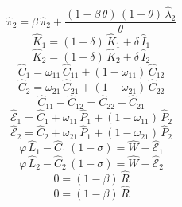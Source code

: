 \begin{dmath}
{{\hat{\pi}_{2}}}={{\beta}}\, {{\hat{\pi}_{2}}}+\frac{\left(1-{{\beta}}\, {{\theta}}\right)\, \left(1-{{\theta}}\right)\, {{\hat{\lambda}_{2}}}}{{{\theta}}}
\end{dmath}
\begin{dmath}
{{\hat{K}_{1}}}=\left(1-{{\delta}}\right)\, {{\hat{K}_{1}}}+{{\delta}}\, {{\hat{I}_{1}}}
\end{dmath}
\begin{dmath}
{{\hat{K}_{2}}}=\left(1-{{\delta}}\right)\, {{\hat{K}_{2}}}+{{\delta}}\, {{\hat{I}_{2}}}
\end{dmath}
\begin{dmath}
{{\hat{C}_{1}}}={{\omega_{11}}}\, {{\hat{C}_{1 1}}}+\left(1-{{\omega_{11}}}\right)\, {{\hat{C}_{1 2}}}
\end{dmath}
\begin{dmath}
{{\hat{C}_{2}}}={{\omega_{21}}}\, {{\hat{C}_{2 1}}}+\left(1-{{\omega_{21}}}\right)\, {{\hat{C}_{2 2}}}
\end{dmath}
\begin{dmath}
{{\hat{C}_{1 1}}}-{{\hat{C}_{1 2}}}={{\hat{C}_{2 2}}}-{{\hat{C}_{2 1}}}
\end{dmath}
\begin{dmath}
{{\hat{\mathscr{E}}_{1}}}={{\hat{C}_{1}}}+{{\omega_{11}}}\, {{\hat{P}_{1}}}+\left(1-{{\omega_{11}}}\right)\, {{\hat{P}_{2}}}
\end{dmath}
\begin{dmath}
{{\hat{\mathscr{E}}_{2}}}={{\hat{C}_{2}}}+{{\omega_{21}}}\, {{\hat{P}_{1}}}+\left(1-{{\omega_{21}}}\right)\, {{\hat{P}_{2}}}
\end{dmath}
\begin{dmath}
{{\varphi}}\, {{\hat{L}_{1}}}-{{\hat{C}_{1}}}\, \left(1-{{\sigma}}\right)={{\hat{W}}}-{{\hat{\mathscr{E}}_{1}}}
\end{dmath}
\begin{dmath}
{{\varphi}}\, {{\hat{L}_{2}}}-{{\hat{C}_{2}}}\, \left(1-{{\sigma}}\right)={{\hat{W}}}-{{\hat{\mathscr{E}}_{2}}}
\end{dmath}
\begin{dmath}
0=\left(1-{{\beta}}\right)\, {{\hat{R}}}
\end{dmath}
\begin{dmath}
0=\left(1-{{\beta}}\right)\, {{\hat{R}}}
\end{dmath}
